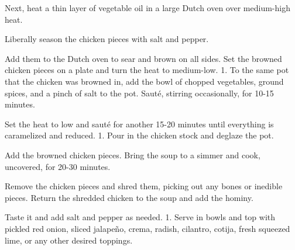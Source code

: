 \documentclass[
  letterpaper,
  DIV=11,
  numbers=noendperiod,
  titlepage=false]{scrreprt}
\begin{document}
Next, heat a thin layer of vegetable oil in a large Dutch oven over
medium-high heat.

Liberally season the chicken pieces with salt and pepper.

Add them to the Dutch oven to sear and brown on all sides. Set the
browned chicken pieces on a plate and turn the heat to medium-low. 1. To
the same pot that the chicken was browned in, add the bowl of chopped
vegetables, ground spices, and a pinch of salt to the pot. Sauté,
stirring occasionally, for 10-15 minutes.

Set the heat to low and sauté for another 15-20 minutes until everything
is caramelized and reduced. 1. Pour in the chicken stock and deglaze the
pot.

Add the browned chicken pieces. Bring the soup to a simmer and cook,
uncovered, for 20-30 minutes.

Remove the chicken pieces and shred them, picking out any bones or
inedible pieces. Return the shredded chicken to the soup and add the
hominy.

Taste it and add salt and pepper as needed. 1. Serve in bowls and top
with pickled red onion, sliced jalapeño, crema, radish, cilantro,
cotija, fresh squeezed lime, or any other desired toppings.
\end{document}
